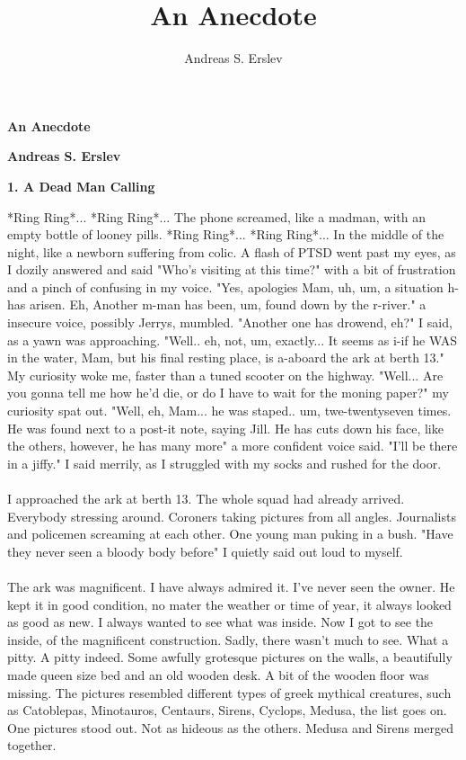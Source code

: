\documentclass[]{article}
\title{An Anecdote}
\author{Andreas S. Erslev}
\begin{document}
\begin{center}
	\Large\textbf{An Anecdote}
\end{center}

\begin{center}
	\large\textbf{Andreas S. Erslev}
\end{center}

\begin{center}
	\large\textbf{1. A Dead Man Calling}
\end{center}

*Ring Ring*... *Ring Ring*... The phone screamed, like a madman, with an empty bottle of looney pills. *Ring Ring*... *Ring Ring*... In the middle of the night, like a newborn suffering from colic. A flash of PTSD went past my eyes, as I dozily answered and said "Who's visiting at this time?" with a bit of frustration and a pinch of confusing in my voice. "Yes, apologies Mam, uh, um, a situation h-has arisen. Eh, Another m-man has been, um, found down by the r-river." a insecure voice, possibly Jerrys, mumbled. "Another one has drowend, eh?" I said, as a yawn was approaching. "Well.. eh, not, um, exactly... It seems as i-if he WAS in the water, Mam, but his final resting place, is a-aboard the ark at berth 13." My curiosity woke me, faster than a tuned scooter on the highway. "Well... Are you gonna tell me how he'd die, or do I have to wait for the moning paper?" my curiosity spat out. "Well, eh, Mam... he was staped.. um, twe-twentyseven times. He was found next to a post-it note, saying Jill. He has cuts down his face, like the others, however, he has many more" a more confident voice said. "I'll be there in a jiffy." I said merrily, as I struggled with my socks and rushed for the door.
\\ \\
I approached the ark at berth 13. The whole squad had already arrived. Everybody stressing around. Coroners taking pictures from all angles. Journalists and policemen screaming at each other. One young man puking in a bush. "Have they never seen a bloody body before" I quietly said out loud to myself. 
\\ \\
The ark was magnificent. I have always admired it. I've never seen the owner. He kept it in good condition, no mater the weather or time of year, it always looked as good as new. I always wanted to see what was inside. Now I got to see the inside, of the magnificent construction. Sadly, there wasn't much to see. What a pitty. A pitty indeed. Some awfully grotesque pictures on the walls, a beautifully made queen size bed and an old wooden desk. A bit of the wooden floor was missing. The pictures resembled different types of greek mythical creatures, such as Catoblepas, Minotauros, Centaurs, Sirens, Cyclops, Medusa, the list goes on. One pictures stood out. Not as hideous as the others. Medusa and Sirens merged together.
\end{document}
